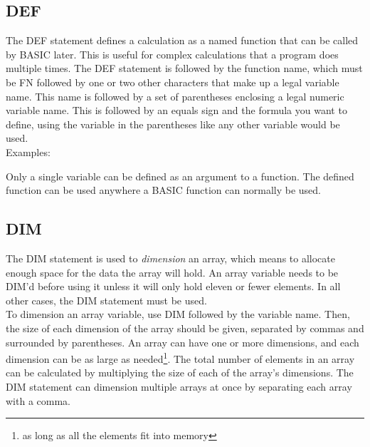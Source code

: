 \subsection{DEF}

The {\ttfamily DEF} statement defines a calculation as a named function that
can be called by BASIC later.  This is useful for complex calculations that a
program does multiple times.  The {\ttfamily DEF} statement is followed by the
function name, which must be {\ttfamily FN} followed by one or two other
characters that make up a legal variable name.  This name is followed by a set
of parentheses enclosing a legal numeric variable name.  This is followed by an
equals sign and the formula you want to define, using the variable in the
parentheses like any other variable would be used.\\

Examples:\\


Only a single variable can be defined as an argument to a function.  The
defined function can be used anywhere a BASIC function can normally be used.\\

\subsection{DIM}

The {\ttfamily DIM} statement is used to \emph{dimension} an array, which means
to allocate enough space for the data the array will hold.  An array variable
needs to be {\ttfamily DIM}'d before using it unless it will only hold eleven
or fewer elements.  In all other cases, the {\ttfamily DIM} statement must be
used.\\

To dimension an array variable, use {\ttfamily DIM} followed by the variable
name.  Then, the size of each dimension of the array should be given, separated
by commas and surrounded by parentheses.  An array can have one or more
dimensions, and each dimension can be as large as needed\footnote{as long as
all the elements fit into memory}.  The total number of elements in an array
can be calculated by multiplying the size of each of the array's dimensions.
The {\ttfamily DIM} statement can dimension multiple arrays at once by
separating each array with a comma.\\

